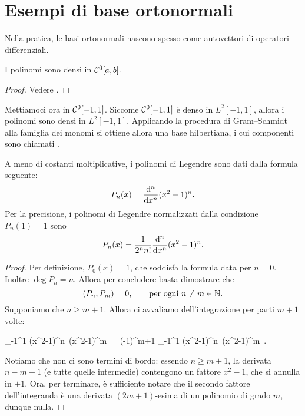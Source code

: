 \section{Esempi di base ortonormali}
Nella pratica, le basi ortonormali nascono spesso come autovettori di operatori differenziali.

\begin{theorem}[Weierstrass]
	I polinomi sono densi in $\mathcal{C}^0[a,b]$.
\end{theorem}
\begin{proof}
	Vedere \cite{rudin1991functional}.
\end{proof}

Mettiamoci ora in $\mathcal{C}^0[-1,1]$. Siccome $\mathcal{C}^0[-1,1]$ è denso in $L^2[-1,1]$, allora i polinomi sono densi in $L^2[-1,1]$. Applicando la procedura di Gram--Schmidt alla famiglia dei monomi si ottiene allora una base hilbertiana, i cui componenti sono chiamati .

\begin{theorem}
	A meno di costanti moltiplicative, i polinomi di Legendre sono dati dalla formula seguente:
	\begin{equation*}
		P_n(x) = \frac{\mathrm{d}{^n}}{\mathrm{d}{x^n}} (x^2-1)^n.
	\end{equation*}
	Per la precisione, i polinomi di Legendre normalizzati dalla condizione $P_n(1) =1$ sono
	\begin{equation*}
		P_n(x) = \frac1{2^n n!} \frac{\mathrm{d}{^n}}{\mathrm{d}{x^n}} (x^2-1)^n.
	\end{equation*}
\end{theorem}
\begin{proof}
	Per definizione, $P_0(x) = 1$, che soddisfa la formula data per $n=0$. Inoltre $\deg P_n = n$.
	Allora per concludere basta dimostrare che
	\begin{equation*}
		(P_n, P_m) = 0, \qquad \text{per ogni $n \neq m \in \mathbb{N}$}.
	\end{equation*}
	Supponiamo che $n \geq m+1$. Allora ci avvaliamo dell'integrazione per parti $m+1$ volte:
	\begin{eqalign*}
		\int_{-1}^1  (x^2-1)^n\,  (x^2-1)^m \,\dx =
		(-1)^{m+1} \int_{-1}^1  (x^2-1)^n\,  (x^2-1)^m \,\dx.
	\end{eqalign*}
	Notiamo che non ci sono termini di bordo: essendo $n \geq m+1$, la derivata $n-m-1$ (e tutte quelle intermedie) contengono un fattore $x^2-1$, che si annulla in $\pm 1$.
	Ora, per terminare, è sufficiente notare che il secondo fattore dell'integranda è una derivata $(2m+1)$-esima di un polinomio di grado $m$, dunque nulla.
\end{proof}

